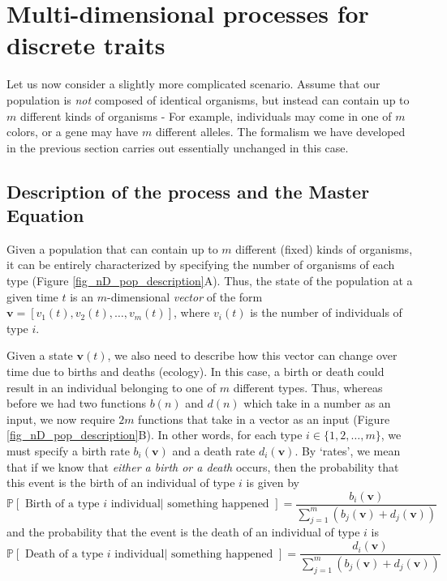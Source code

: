 \section{Multi-dimensional processes for discrete traits}\label{sec_nD_processes}
Let us now consider a slightly more complicated scenario. Assume that our population is \emph{not} composed of identical organisms, but instead can contain up to $m$ different kinds of organisms - For example, individuals may come in one of $m$ colors, or a gene may have $m$ different alleles. The formalism we have developed in the previous section carries out essentially unchanged in this case.

\subsection{Description of the process and the Master Equation}
Given a population that can contain up to $m$ different (fixed) kinds of organisms, it can be entirely characterized by specifying the number of organisms of each type (Figure \ref{fig_nD_pop_description}A). Thus, the state of the population at a given time $t$ is an $m$-dimensional \emph{vector} of the form $\mathbf{v} = [v_1(t),v_2(t),\ldots,v_m(t)]$, where $v_i(t)$ is the number of individuals of type $i$.

Given a state $\mathbf{v}(t)$,  we also need to describe how this vector can change over time due to births and deaths (ecology). In this case, a birth or death could result in an individual belonging to one of $m$ different types. Thus, whereas before we had two functions $b(n)$ and $d(n)$ which take in a number as an input, we now require $2m$ functions that take in a vector as an input (Figure \ref{fig_nD_pop_description}B). In other words, for each type $i \in \{1,2,\ldots,m\}$, we must specify a birth rate $b_i(\mathbf{v})$ and a death rate $d_i(\mathbf{v})$. By `rates', we mean that if we know that \emph{either a birth or a death} occurs, then the probability that this event is the birth of an individual of type $i$ is given by
\begin{equation*}
\mathbb{P}[\textrm{ Birth of a type $i$ individual} | \textrm{ something happened }] = \frac{b_i(\mathbf{v})}{\sum\limits_{j=1}^{m}(b_j(\mathbf{v})+d_j(\mathbf{v}))}
\end{equation*}
and the probability that the event is the death of an individual of type $i$ is
\begin{equation*}
\mathbb{P}[\textrm{ Death of a type $i$ individual} | \textrm{ something happened }] = \frac{d_i(\mathbf{v})}{\sum\limits_{j=1}^{m}(b_j(\mathbf{v})+d_j(\mathbf{v}))}
\end{equation*}

